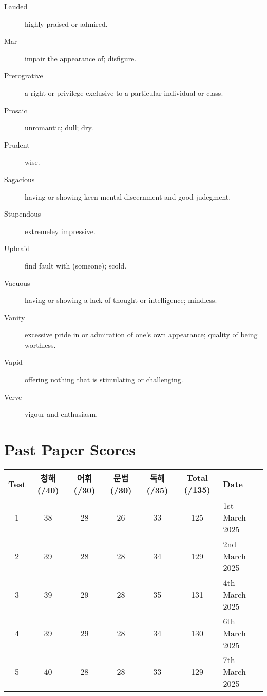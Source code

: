 \documentclass{article}
\begin{document}
\begin{multicols}{2}
\begin{description}
    \item[Lauded] highly praised or admired.
    \item[Mar] impair the appearance of; disfigure.
    \item[Prerogrative] a right or privilege exclusive to a particular individual or class.
    \item[Prosaic] unromantic; dull; dry.
    \item[Prudent] wise.
    \item[Sagacious] having or showing keen mental discernment and good judegment.
    \item[Stupendous] extremeley impressive.
    \item[Upbraid] find fault with (someone); scold.
    \item[Vacuous] having or showing a lack of thought or intelligence; mindless.
    \item[Vanity] excessive pride in or admiration of one's own appearance; quality of being worthless.
    \item[Vapid] offering nothing that is stimulating or challenging.
    \item[Verve] vigour and enthusiasm.
\end{description}
\end{multicols}


\section*{Past Paper Scores}
\begin{tabularx}{\textwidth}{c c c c c c l}
\toprule
\textbf{Test} & \textbf{청해 (/40)} & \textbf{어휘 (/30)} & \textbf{문법 (/30)} & \textbf{독해 (/35)} & \textbf{Total (/135)} & \textbf{Date} \\
\midrule
1 & 38 & 28 & 26 & 33 & 125 & 1st March 2025 \\
2 & 39 & 28 & 28 & 34 & 129 & 2nd March 2025 \\
3 & 39 & 29 & 28 & 35 & 131 & 4th March 2025 \\
4 & 39 & 29 & 28 & 34 & 130 & 6th March 2025 \\
5 & 40 & 28 & 28 & 33 & 129 & 7th March 2025 \\
\bottomrule
\end{tabularx}
\end{document}
